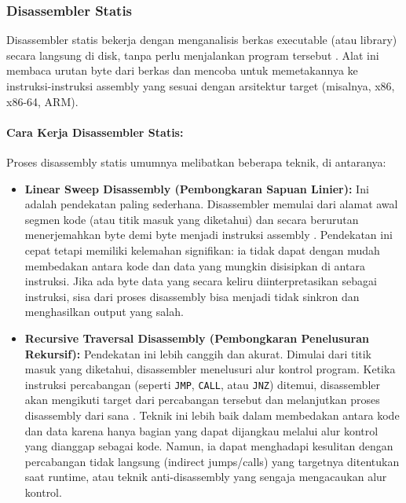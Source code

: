 \label{subsec:disassembler_statis}
\subsubsection{Disassembler Statis}

Disassembler statis bekerja dengan menganalisis berkas executable (atau library) secara langsung di disk, tanpa perlu menjalankan program tersebut \cite{Eilam2011}. Alat ini membaca urutan byte dari berkas dan mencoba untuk memetakannya ke instruksi-instruksi assembly yang sesuai dengan arsitektur target (misalnya, x86, x86-64, ARM).

\paragraph{Cara Kerja Disassembler Statis:}
Proses disassembly statis umumnya melibatkan beberapa teknik, di antaranya:

\begin{itemize}
\item \textbf{Linear Sweep Disassembly (Pembongkaran Sapuan Linier):} Ini adalah pendekatan paling sederhana. Disassembler memulai dari alamat awal segmen kode (atau titik masuk yang diketahui) dan secara berurutan menerjemahkan byte demi byte menjadi instruksi assembly \cite{Sikorski2012}. Pendekatan ini cepat tetapi memiliki kelemahan signifikan: ia tidak dapat dengan mudah membedakan antara kode dan data yang mungkin disisipkan di antara instruksi. Jika ada byte data yang secara keliru diinterpretasikan sebagai instruksi, sisa dari proses disassembly bisa menjadi tidak sinkron dan menghasilkan output yang salah.
\item \textbf{Recursive Traversal Disassembly (Pembongkaran Penelusuran Rekursif):} Pendekatan ini lebih canggih dan akurat. Dimulai dari titik masuk yang diketahui, disassembler menelusuri alur kontrol program. Ketika instruksi percabangan (seperti \texttt{JMP}, \texttt{CALL}, atau \texttt{JNZ}) ditemui, disassembler akan mengikuti target dari percabangan tersebut dan melanjutkan proses disassembly dari sana \cite{Eilam2011, Ko2007}. Teknik ini lebih baik dalam membedakan antara kode dan data karena hanya bagian yang dapat dijangkau melalui alur kontrol yang dianggap sebagai kode. Namun, ia dapat menghadapi kesulitan dengan percabangan tidak langsung (indirect jumps/calls) yang targetnya ditentukan saat runtime, atau teknik anti-disassembly yang sengaja mengacaukan alur kontrol.
\end{itemize}

